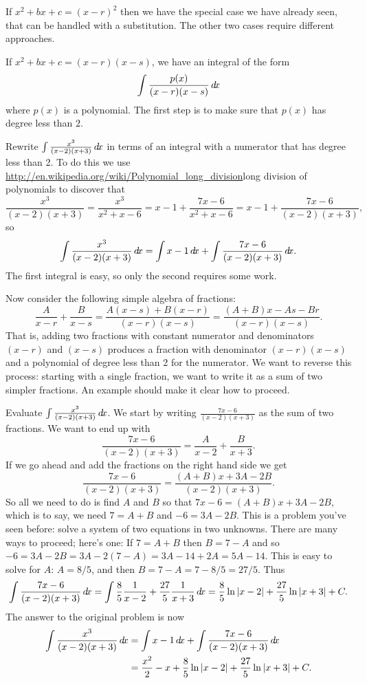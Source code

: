\documentclass{ximera}
\begin{document}
If $x^2+bx+c=(x-r)^2$ then we have the special case we have already
seen, that can be handled with a substitution. The other two cases
require different approaches.

If  $x^2+bx+c=(x-r)(x-s)$, we have an integral of the form
\[
\int{p(x)\over (x-r)(x-s)}\mathop{}\!d\! x
\]
where $p(x)$ is a polynomial. The first step is to make sure that
$p(x)$ has degree less than $2$.

\begin{example}
Rewrite $\int \frac{x^3}{(x-2)(x+3)}\mathop{}\!d\! x$ in terms of an integral
with a numerator that has degree less than 2. To do this we use 
\url{http://en.wikipedia.org/wiki/Polynomial_long_division}long
division of polynomials  to 
discover that
\[
  \frac{x^3}{(x-2)(x+3)}=\frac{x^3}{x^2+x-6}=x-1+\frac{7x-6}{x^2+x-6}=
  x-1+\frac{7x-6}{(x-2)(x+3)},
\]
so 
\[
  \int \frac{x^3}{(x-2)(x+3)}\mathop{}\!d\! x=\int x-1\mathop{}\!d\! x +\int \frac{7x-6}{(x-2)(x+3)}\mathop{}\!d\! x.
\]
The first integral is easy, so only the second requires some work.
\end{example}

Now consider the following simple algebra of fractions:
\[
  \frac{A}{x-r}+\frac{B}{x-s}=\frac{A(x-s)+B(x-r)}{(x-r)(x-s)}=
  \frac{(A+B)x-As-Br}{(x-r)(x-s)}.
\]
That is, adding two fractions with constant numerator and denominators
$(x-r)$ and $(x-s)$ produces a fraction with denominator $(x-r)(x-s)$
and a polynomial of degree less than 2 for the numerator. We want to
reverse this process: starting with a single fraction, we want to
write it as a sum of two simpler fractions. An example should make it
clear how to proceed.

\begin{example} Evaluate $\int \frac{x^3}{(x-2)(x+3)}\mathop{}\!d\! x$.  We start by
writing $\frac{7x-6}{(x-2)(x+3)}$ as the sum of two fractions.  We
want to end up with
\[
\frac{7x-6}{(x-2)(x+3)}=\frac{A}{x-2}+\frac{B}{x+3}.
\]
If we go ahead and add the fractions on the right hand side we get
\[
\frac{7x-6}{(x-2)(x+3)}=\frac{(A+B)x+3A-2B}{(x-2)(x+3)}.
\]
So all we need to do is find $A$ and $B$ so that $7x-6=(A+B)x+3A-2B$,
which is to say, we need $7=A+B$ and $-6=3A-2B$. This is a problem
you've seen before: solve a system of two equations in two
unknowns. There are many ways to proceed; here's one: If $7=A+B$ then
$B=7-A$ and so $-6=3A-2B=3A-2(7-A)=3A-14+2A=5A-14$. This is easy to
solve for $A$: $A= 8/5$, and then $B=7-A=7-8/5=27/5$. Thus
\[
  \int \frac{7x-6}{(x-2)(x+3)}\mathop{}\!d\! x=
  \int \frac{8}{5}\frac{1}{x-2}+\frac{27}{5}\frac{1}{x+3}\mathop{}\!d\! x=
  \frac{8}{5}\ln |x-2|+\frac{27}{5}\ln|x+3|+C.
\]
The answer to the original problem is now
\begin{align*}
  \int \frac{x^3}{(x-2)(x+3)}\mathop{}\!d\! x
  &=\int x-1\mathop{}\!d\! x +\int \frac{7x-6}{(x-2)(x+3)}\mathop{}\!d\! x \\
  &=\frac{x^2}{2}-x+\frac{8}{5}\ln |x-2|+\frac{27}{5}\ln|x+3|+C. 
\end{align*}
\end{example}
\end{document}
